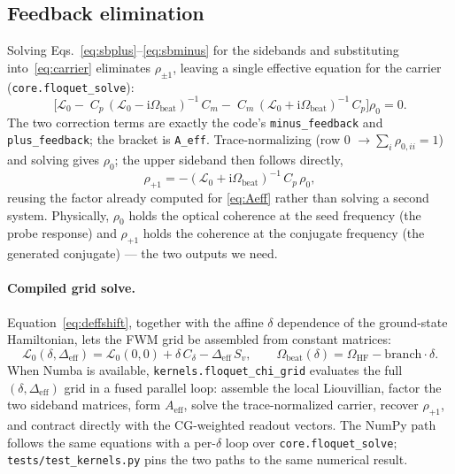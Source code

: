 \documentclass[11pt]{article}
\newcommand{\ii}{\mathrm{i}}
\newcommand{\eff}{\mathrm{eff}}
\newcommand{\HF}{\mathrm{HF}}
\newcommand{\code}[1]{\texttt{#1}}
\newcommand{\Lcal}{\mathcal{L}}
\begin{document}
\subsection{Feedback elimination}

Solving Eqs.~\eqref{eq:sbplus}--\eqref{eq:sbminus} for the sidebands and
substituting into~\eqref{eq:carrier} eliminates $\rho_{\pm1}$, leaving a single
effective equation for the carrier (\code{core.floquet\_solve}):
\begin{equation}
\boxed{\;
\Big[\Lcal_0
-\;C_p\,(\Lcal_0-\ii\Omega_{\text{beat}})^{-1}\,C_m
-\;C_m\,(\Lcal_0+\ii\Omega_{\text{beat}})^{-1}\,C_p\Big]\rho_0=0.
\;}
\label{eq:Aeff}
\end{equation}
The two correction terms are exactly the code's \code{minus\_feedback} and
\code{plus\_feedback}; the bracket is \code{A\_eff}. Trace-normalizing (row $0$
$\to\sum_i\rho_{0,ii}=1$) and solving gives $\rho_0$; the upper sideband then
follows directly,
\begin{equation}
\rho_{+1}=-(\Lcal_0+\ii\Omega_{\text{beat}})^{-1}\,C_p\,\rho_0,
\label{eq:rhop1}
\end{equation}
reusing the factor already computed for \eqref{eq:Aeff} rather than solving a
second system. Physically, $\rho_0$ holds the optical coherence at the seed
frequency (the probe response) and $\rho_{+1}$ holds the coherence at the
conjugate frequency (the generated conjugate) --- the two outputs we need.

\paragraph{Compiled grid solve.} Equation~\eqref{eq:deffshift}, together with the
affine $\delta$ dependence of the ground-state Hamiltonian, lets the FWM grid be
assembled from constant matrices:
\begin{equation}
\Lcal_0(\delta,\Delta_\eff)
=\Lcal_0(0,0)+\delta\,C_\delta-\Delta_\eff\,S_v,
\qquad
\Omega_{\text{beat}}(\delta)=\Omega_{\HF}-\text{branch}\cdot\delta .
\end{equation}
When Numba is available, \code{kernels.floquet\_chi\_grid} evaluates the full
$(\delta,\Delta_\eff)$ grid in a fused parallel loop: assemble the local
Liouvillian, factor the two sideband matrices, form $A_{\text{eff}}$, solve the
trace-normalized carrier, recover $\rho_{+1}$, and contract directly with the
CG-weighted readout vectors. The NumPy path follows the same equations with a
per-$\delta$ loop over \code{core.floquet\_solve}; \code{tests/test\_kernels.py}
pins the two paths to the same numerical result.
\end{document}
